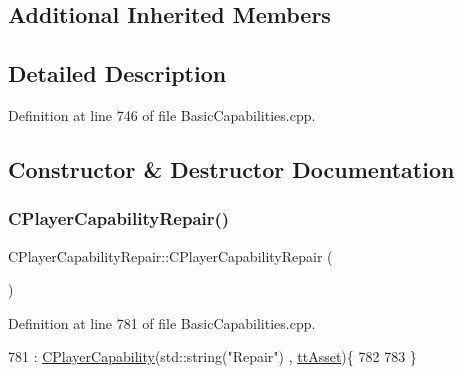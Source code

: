 \subsection*{Additional Inherited Members}


\subsection{Detailed Description}


Definition at line 746 of file Basic\+Capabilities.\+cpp.



\subsection{Constructor \& Destructor Documentation}
\hypertarget{classCPlayerCapabilityRepair_a1c11519a127c65cd5b5ead8d9537c240}{}\label{classCPlayerCapabilityRepair_a1c11519a127c65cd5b5ead8d9537c240} 
\subsubsection{\texorpdfstring{C\+Player\+Capability\+Repair()}{CPlayerCapabilityRepair()}}
{\footnotesize\ttfamily C\+Player\+Capability\+Repair\+::\+C\+Player\+Capability\+Repair (\begin{DoxyParamCaption}{ }\end{DoxyParamCaption})\hspace{0.3cm}{\ttfamily [protected]}}



Definition at line 781 of file Basic\+Capabilities.\+cpp.


\begin{DoxyCode}
781                                                  : \hyperlink{classCPlayerCapability_a303de62aba5d3f65d9a8e013c64a96c1}{CPlayerCapability}(std::string(\textcolor{stringliteral}{"Repair"})
      , \hyperlink{classCPlayerCapability_a9d3450ed1532fd536bd6cbb1e2eef02facb6ee2a28b5d50b9d3009c272f2881aa}{ttAsset})\{
782 
783 \}
\end{DoxyCode}
\hypertarget{classCPlayerCapabilityRepair_ad8ed0fc101b58a3b4eeb42fa3cab0511}{}\label{classCPlayerCapabilityRepair_ad8ed0fc101b58a3b4eeb42fa3cab0511} 
